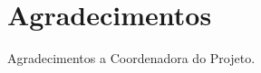 \label{Agradecimentos}
\cleardoublepage
\section*{Agradecimentos}

Agradecimentos a Coordenadora do Projeto.

